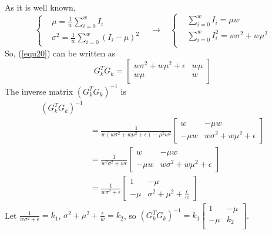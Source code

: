 \documentclass[journal]{IEEEtran}
\begin{document}
As it is well known, 
\begin{equation}
    \left \{
    \begin{aligned}
         &\mu = \frac{1}{w} \sum\limits_{i=0}^{w}I_i  \\
         &\sigma^2 = \frac{1}{w} \sum\limits_{i=0}^{w}(I_i - \mu)^2 
    \end{aligned}
    \right .~~~~\rightarrow~~~~ 
    \left \{
    \begin{aligned}
        & \sum\limits_{i=0}^{w}I_i = \mu w \\
        & \sum\limits_{i=0}^{w}I_i^2 = w \sigma^2 + w \mu^2 \\
    \end{aligned}
    \right .
    \label{equ21}
\end{equation}
So, (\ref{equ20}) can be written as 
\begin{equation}
    G_k^T G_k = \begin{bmatrix}
                    w\sigma^2 + w\mu^2 + \epsilon & w \mu \\
                    w \mu & w \\
                \end{bmatrix}
    \label{equ22}
\end{equation}
The inverse matrix $(G_k^T G_k)^{-1}$ is
\begin{equation}
    \begin{aligned}
        (G_k^T G_k)^{-1} & \\
        &= \frac{1}{w(w\sigma^2 + w\mu^2 + \epsilon) -\mu^2 w^2} \begin{bmatrix}
                w & -\mu w \\
                -\mu w & w\sigma^2 + w\mu^2 + \epsilon
            \end{bmatrix} \\ 
            &= \frac{1}{w^2\sigma^2 + w\epsilon} \begin{bmatrix}
                w & -\mu w \\
                -\mu w & w\sigma^2 + w\mu^2 + \epsilon
            \end{bmatrix} \\
            &= \frac{1}{w\sigma^2 + \epsilon} \begin{bmatrix}
                1 & -\mu \\
                -\mu & \sigma^2 + \mu^2 + \frac{\epsilon}{w}
            \end{bmatrix}
    \end{aligned}
    \label{equ23}
\end{equation}
Let $\frac{1}{w\sigma^2+\epsilon} = k_1$, $\sigma^2+\mu^2+\frac{\epsilon}{w}=k_2$, so 
$(G_k^T G_k)^{-1} = k_1 \begin{bmatrix}
    1 & -\mu \\
    -\mu & k_2 \\
\end{bmatrix}$. \\
\end{document}
